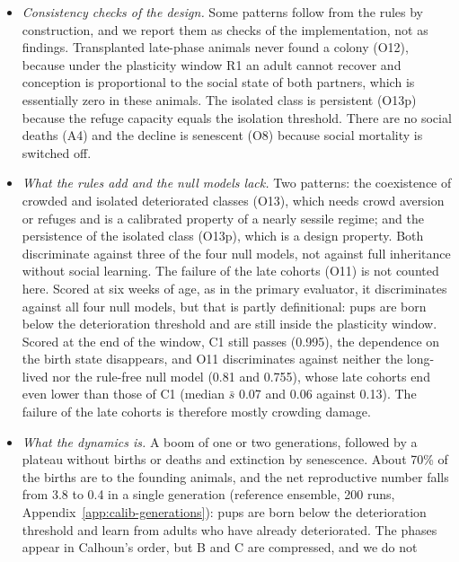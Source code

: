 \begin{enumerate}
\begin{itemize}
    competence (O11 in 0.755 of the runs, and 0.81 in the long-lived control), through accumulated crowding damage.
    These patterns verify that the model has a boom and its end; they are not evidence for the rules.
  \item \emph{Consistency checks of the design.} Some patterns follow from the rules by construction, and we report
    them as checks of the implementation, not as findings. Transplanted late-phase animals never found a colony
    (O12), because under the plasticity window R1 an adult cannot recover and conception is proportional to the
    social state of both partners, which is essentially zero in these animals. The isolated class is persistent
    (O13p) because the refuge capacity equals the isolation threshold. There are no social deaths (A4) and the decline
    is senescent (O8) because social mortality is switched off.
  \item \emph{What the rules add and the null models lack.} Two patterns: the coexistence of crowded and
    isolated deteriorated classes (O13), which needs crowd aversion or refuges and is a calibrated property of a
    nearly sessile regime; and the persistence of the isolated class (O13p), which is a design property. Both
    discriminate against three of the four null models, not against full inheritance without social learning. The
    failure of the late cohorts (O11) is not counted here. Scored at six weeks of age, as in the primary
    evaluator, it discriminates against all four null models, but that is partly definitional: pups are born
    below the deterioration threshold and are still inside the plasticity window. Scored at the end of the window,
    \textsf{C1} still passes (0.995), the dependence on the birth state disappears, and O11 discriminates against
    neither the long-lived nor the rule-free null model (0.81 and 0.755), whose late cohorts end even lower than
    those of \textsf{C1} (median $\bar s$ 0.07 and 0.06 against 0.13). The failure of the late cohorts is therefore mostly crowding damage.
\item \emph{What the dynamics is.} A boom of one or two generations, followed by a plateau without births or
    deaths and extinction by senescence. About 70\% of the births are to the founding animals, and the net
    reproductive number falls from 3.8 to 0.4 in a single generation (reference ensemble, 200 runs,
    Appendix~\ref{app:calib-generations}): pups are born below the deterioration threshold and learn from adults
    who have already deteriorated. The phases appear in Calhoun's order, but B and C are compressed, and we do not

\end{itemize}
\end{enumerate}
